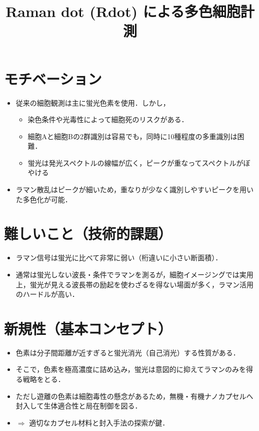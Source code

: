 \documentclass[dvipdfmx]{jsarticle}
\title{Raman dot (Rdot) による多色細胞計測}
\author{}
\date{}
\begin{document}
\maketitle
\vspace{-60pt}
\section{モチベーション}
\begin{itemize}
  \item 従来の細胞観測は主に蛍光色素を使用．しかし，
  \begin{itemize}
    \item 染色条件や光毒性によって細胞死のリスクがある．
    \item 細胞Aと細胞Bの2群識別は容易でも，同時に10種程度の多重識別は困難．
    \item 蛍光は発光スペクトルの線幅が広く，ピークが重なってスペクトルがぼやける
  \end{itemize}
  \item ラマン散乱はピークが細いため，重なりが少なく識別しやすいピークを用いた多色化が可能．
\end{itemize}

\section{難しいこと（技術的課題）}
\begin{itemize}
  \item ラマン信号は蛍光に比べて非常に弱い（桁違いに小さい断面積）．
  \item 通常は蛍光しない波長・条件でラマンを測るが，細胞イメージングでは実用上，蛍光が見える波長帯の励起を使わざるを得ない場面が多く，ラマン活用のハードルが高い．
\end{itemize}

\section{新規性（基本コンセプト）}
\begin{itemize}
  \item 色素は分子間距離が近すぎると蛍光消光（自己消光）する性質がある．
  \item そこで，色素を極高濃度に詰め込み，蛍光は意図的に抑えてラマンのみを得る戦略をとる．
  \item ただし遊離の色素は細胞毒性の懸念があるため，無機・有機ナノカプセルへ封入して生体適合性と局在制御を図る．
  \item $\Rightarrow$ 適切なカプセル材料と封入手法の探索が鍵．
\end{itemize}
\end{document}
